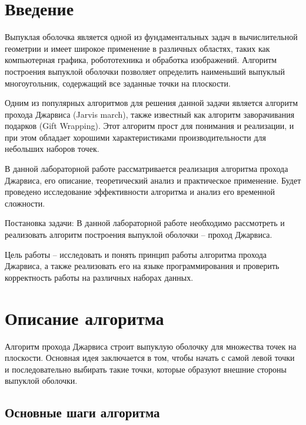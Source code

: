 \documentclass[]{article}
\theoremstyle{remark}
\theoremstyle{definition}
\begin{document}
\setcounter{page}{2}

\tableofcontents
\newpage

\section{Введение}

\par Выпуклая оболочка является одной из фундаментальных задач в вычислительной геометрии и имеет широкое применение в различных областях, таких как компьютерная графика, робототехника и обработка изображений. Алгоритм построения выпуклой оболочки позволяет определить наименьший выпуклый многоугольник, содержащий все заданные точки на плоскости.

\par Одним из популярных алгоритмов для решения данной задачи является алгоритм прохода Джарвиса (Jarvis march), также известный как алгоритм заворачивания подарков (Gift Wrapping). Этот алгоритм прост для понимания и реализации, и при этом обладает хорошими характеристиками производительности для небольших наборов точек.

\par В данной лабораторной работе рассматривается реализация алгоритма прохода Джарвиса, его описание, теоретический анализ и практическое применение. Будет проведено исследование эффективности алгоритма и анализ его временной сложности.

\par Постановка задачи: В данной лабораторной работе необходимо рассмотреть и реализовать алгоритм построения выпуклой оболочки – проход Джарвиса. 

Цель работы – исследовать и понять принцип работы алгоритма прохода Джарвиса, а также реализовать его на языке программирования и проверить корректность работы на различных наборах данных.

\newpage

\section{Описание алгоритма}

\par Алгоритм прохода Джарвиса строит выпуклую оболочку для множества точек на плоскости. Основная идея заключается в том, чтобы начать с самой левой точки и последовательно выбирать такие точки, которые образуют внешние стороны выпуклой оболочки.

\subsection{Основные шаги алгоритма}
\end{document}
